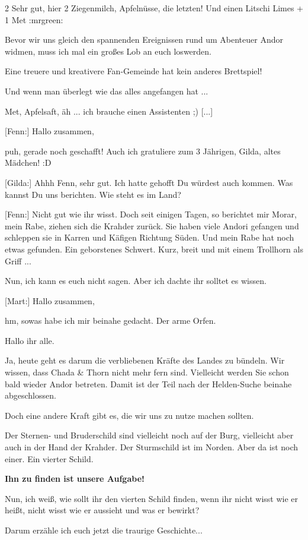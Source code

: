 \documentclass[10pt, a4paper, oneside]{book}
\begin{document}
\begin{multicols}{2}
Sehr gut, hier 2 Ziegenmilch, Apfelnüsse, die letzten! Und einen Litschi Limes + 1 Met :mrgreen:

Bevor wir uns gleich den spannenden Ereignissen rund um Abenteuer Andor widmen, muss ich mal ein großes Lob an euch loswerden.

Eine treuere und kreativere Fan-Gemeinde hat kein anderes Brettspiel!

Und wenn man überlegt wie das alles angefangen hat ...

Met, Apfelsaft, äh ... ich brauche einen Assistenten ;) [...]

[Fenn:] Hallo zusammen,

puh, gerade noch geschafft! Auch ich gratuliere zum 3 Jährigen, Gilda, altes Mädchen! :D

[Gilda:] Ahhh Fenn, sehr gut. Ich hatte gehofft Du würdest auch kommen. Was kannst Du uns berichten. Wie steht es im Land?

[Fenn:] Nicht gut wie ihr wisst. Doch seit einigen Tagen, so berichtet mir Morar, mein Rabe, ziehen sich die Krahder zurück. Sie haben viele Andori gefangen und schleppen sie in Karren und Käfigen Richtung Süden. Und mein Rabe hat noch etwas gefunden. Ein geborstenes Schwert. Kurz, breit und mit einem Trollhorn als Griff ...

Nun, ich kann es euch nicht sagen. Aber ich dachte ihr solltet es wissen.

[Mart:] Hallo zusammen,

hm, sowas habe ich mir beinahe gedacht. Der arme Orfen.

Hallo ihr alle.

Ja, heute geht es darum die verbliebenen Kräfte des Landes zu bündeln. Wir wissen, dass Chada \& Thorn nicht mehr fern sind. Vielleicht werden Sie schon bald wieder Andor betreten. Damit ist der Teil nach der Helden-Suche beinahe abgeschlossen.

Doch eine andere Kraft gibt es, die wir uns zu nutze machen sollten.

Der Sternen- und Bruderschild sind vielleicht noch auf der Burg, vielleicht aber auch in der Hand der Krahder. Der Sturmschild ist im Norden. Aber da ist noch einer. Ein vierter Schild.

\textbf{Ihn zu finden ist unsere Aufgabe!}

Nun, ich weiß, wie sollt ihr den vierten Schild finden, wenn ihr nicht wisst wie er heißt, nicht wisst wie er aussieht und was er bewirkt?

Darum erzähle ich euch jetzt die traurige Geschichte...


\end{multicols}
\end{document}
